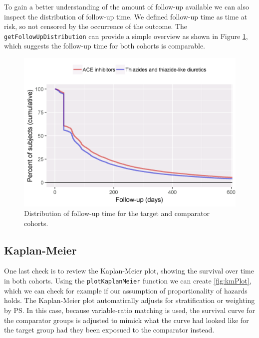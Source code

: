 \documentclass[11pt]{book}
\theoremstyle{definition}
\theoremstyle{definition}
\theoremstyle{definition}
\theoremstyle{remark}
\begin{document}
To gain a better understanding of the amount of follow-up available we can also inspect the distribution of follow-up time. We defined follow-up time as time at risk, so not censored by the occurrence of the outcome. The \texttt{getFollowUpDistribution} can provide a simple overview as shown in Figure \ref{fig:followUp}, which suggests the follow-up time for both cohorts is comparable.

\begin{figure}

{\centering \includegraphics[width=0.8\linewidth]{images/PopulationLevelEstimation/followUp} 

}

\caption{Distribution of follow-up time for the target and comparator cohorts.}\label{fig:followUp}
\end{figure}

\hypertarget{kaplan-meier}{%
\subsection{Kaplan-Meier}\label{kaplan-meier}}

One last check is to review the Kaplan-Meier plot, showing the survival over time in both cohorts. Using the \texttt{plotKaplanMeier} function we can create \ref{fig:kmPlot}, which we can check for example if our assumption of proportionality of hazards holds. The Kaplan-Meier plot automatically adjusts for stratification or weighting by PS. In this case, because variable-ratio matching is used, the survival curve for the comparator groups is adjusted to mimick what the curve had looked like for the target group had they been exposued to the comparator instead.  
\end{document}
